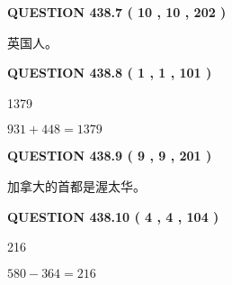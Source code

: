 \documentclass{ctexart}
\begin{document}
 
  
\vspace{0.2in}
  
{\textbf{\Large{QUESTION
438.7 
 ( 10 , 10 , 202 )
}}}
  
  
 
 
\noindent{}
 
 
英国人。
 
 
 
 
  
\vspace{0.2in}
  
{\textbf{\Large{QUESTION
438.8 
 ( 1 , 1 , 101 )
}}}
  
  
 
 
\noindent{}

1379
 
 
 
 
\noindent{}

$ %
931 +  %
448=   %
1379$
 
 
  
\vspace{0.2in}
  
{\textbf{\Large{QUESTION
438.9 
 ( 9 , 9 , 201 )
}}}
  
  
 
 
\noindent{}
 
 
加拿大的首都是渥太华。
 
 
 
 
  
\vspace{0.2in}
  
{\textbf{\Large{QUESTION
438.10 
 ( 4 , 4 , 104 )
}}}
  
  
 
 
\noindent{}

216
 
 
 
 
\noindent{}

$ %
580 -  %
364=   %
216$
 
 
   
\end{document}
